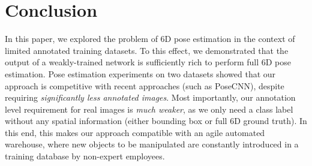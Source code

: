 \documentclass[letterpaper, 10 pt, conference]{ieeeconf}  %
\begin{document}
\section{Conclusion}\label{sec:conclu}

In this paper, we explored the problem of 6D pose estimation in the context of limited annotated training datasets. To this effect, we demonstrated that the output of a weakly-trained network is sufficiently rich to perform full 6D pose estimation. Pose estimation experiments on two datasets showed that our approach is competitive with recent approaches (such as PoseCNN), despite requiring \emph{significantly less annotated images}. Most importantly, our annotation level requirement for real images is \emph{much weaker}, as we only need a class label without any spatial information (either bounding box or full 6D ground truth). %
In this end, this makes our approach compatible with an agile automated warehouse, where new objects to be manipulated are constantly introduced in a training database by non-expert employees.
\end{document}
